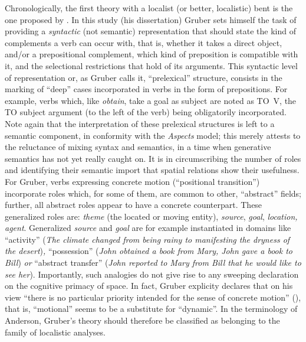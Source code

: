 \documentclass[english,output=paper,colorlinks,citecolor=brown]{../langscibook}
\begin{document}
Chronologically, the first theory with a localist (or better, localistic) bent is the one proposed by \citet{Gruber1965}. In this study (his dissertation) Gruber sets himself the task of providing a \textit{syntactic} (not semantic) representation that should state the kind of complements a verb can occur with, that is, whether it takes a direct object, and/or a prepositional complement, which kind of preposition is compatible with it, and the selectional restrictions that hold of its arguments. This syntactic level of representation or, as Gruber calls it, “prelexical” structure, consists in the marking of “deep” cases incorporated in verbs in the form of prepositions. For example, verbs which, like \textit{obtain}, take a goal as subject are noted as \textsc{TO~V}, the \textsc{TO} subject argument (to the left of the verb) being obligatorily incorporated. Note again that the interpretation of these prelexical structures is left to a semantic component, in conformity with the \textit{Aspects} model; this merely attests to the reluctance of mixing syntax and semantics, in a time when generative semantics has not yet really caught on. It is in circumscribing the number of roles and identifying their semantic import that spatial relations show their usefulness. For Gruber, verbs expressing concrete motion (“positional transition”) incorporate roles which, for some of them, are common to other, “abstract” fields; further, all abstract roles appear to have a concrete counterpart. These generalized roles are: \textit{theme} (the located or moving entity), \textit{source}, \textit{goal}, \textit{location, agent}. Generalized \textit{source} and \textit{goal} are for example instantiated in domains like “activity” (\textit{The climate changed from being rainy to manifesting the dryness of the desert})\textit{, }“possession” (\textit{John obtained a book from Mary, John gave a book to Bill})\textit{ or }“abstract transfer” (\textit{John reported to Mary from Bill that he would like to see her}). Importantly, such analogies do not give rise to any sweeping declaration on the cognitive primacy of space. In fact, Gruber explicity declares that on his view “there is no particular priority intended for the sense of concrete motion” (\citealt[48]{Gruber1965}), that is, “motional” seems to be a substitute for “dynamic”. In the terminology of Anderson, Gruber’s theory should therefore be classified as belonging to the family of localistic analyses.
\end{document}
